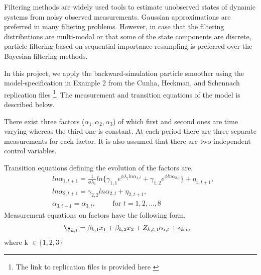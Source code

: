 \documentclass[11pt, a4paper, leqno]{article}
\begin{document}
Filtering methods are widely used tools to estimate unobserved states of dynamic systems from noisy observed measurements. Gaussian approximations are preferred in many filtering problems. However, in case that the filtering distributions are multi-modal or that some of the state components are discrete, particle filtering based on sequential importance resampling is preferred over the Bayesian filtering methods\nocite{sarkka2013}. \par
In this project, we apply the backward-simulation particle smoother using the model-specification in Example 2 from the Cunha, Heckman, and Schennach replication files \footnote{The link to replication files is provided here \citep{chs_rep}}. The measurement and transition equations of the model is described below. \par
There exist three factors ($\alpha_1, \alpha_2, \alpha_3$) of which first and second ones are time varying whereas the third one is constant. At each period there are three separate measurements for each factor. It is also assumed that there are two independent control variables.  \par 
Transition equations defining the evolution of the factors are,
\begin{align}
& ln\alpha_{1, t+1}  = \displaystyle \frac{1}{\phi \lambda_1} ln \{ \gamma_{1, 1} e^{\phi \lambda_1 ln\alpha_{1, t}} + \gamma_{1, 2}  e^{\phi ln\alpha_{2, t}} \} + \eta_{1, t+1}, \\
& ln\alpha_{2, t+1} = \gamma_{2, 2} ln\alpha_{2, t} + \eta_{2, t+1}, \\
& \alpha_{3,t+1} = \alpha_{3,t}, \hspace{1cm} \text{for $t=1, 2, ..., 8$}
\end{align}
Measurement equations on factors have the following form,
\begin{align*}
& \y_{k, t} = \beta_{k, 1}x_1 + \beta_{k, 2}x_2 + Z_{k, t, 1}\alpha_{i, t} + \epsilon_{k, t} ,
\end{align*}
where k $\in \{1, 2, 3\}$












\clearpage







\end{document}
